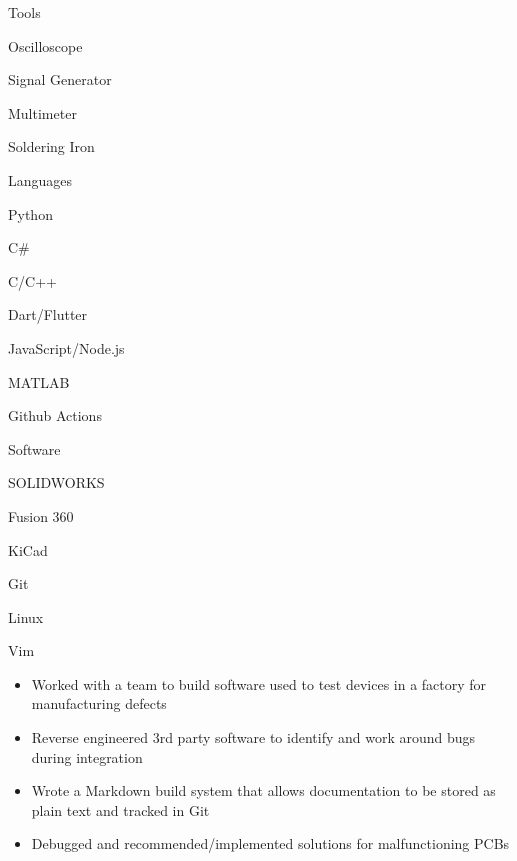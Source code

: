 \documentclass{resume}
\author{Jasper Chan}
\begin{document}
\maketitle

\vspace{-1em} %
\TechnicalSkills

\begin{TechSkills}{Tools}
    \item Oscilloscope
    \item Signal Generator
    \item Multimeter
    \item Soldering Iron
\end{TechSkills}
\begin{TechSkills}{Languages}
    \item Python
    \item C\#
    \item C/C++
    \item Dart/Flutter
    \item JavaScript/Node.js
    \item MATLAB
    \item Github Actions
\end{TechSkills}
\begin{TechSkills}{Software}
    \item SOLIDWORKS
    \item Fusion 360
    \item KiCad
    \item Git
    \item Linux
    \item Vim
\end{TechSkills}

\WorkExperience

\begin{itemize}
    \item Worked with a team to build software used to test devices in a factory for manufacturing defects
    \item Reverse engineered 3rd party software to identify and work around bugs during integration
    \item Wrote a Markdown build system that allows documentation to be stored as plain text and tracked in Git
    \item Debugged and recommended/implemented solutions for malfunctioning PCBs
\end{itemize}
\end{document}
